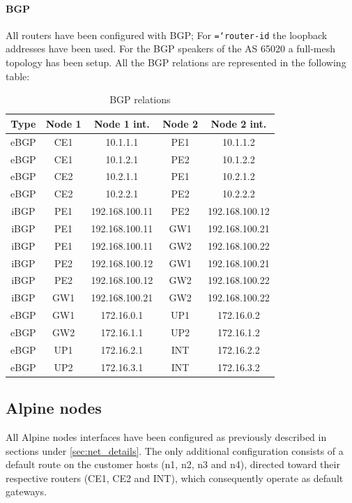 \documentclass{report}
\newcommand{\monospaced}[1]{\texttt{\hyphenchar\font=`\-#1}}
\begin{document}
\paragraph{BGP}
All routers have been configured with BGP; For \monospaced{router-id} the loopback addresses have been used. For the BGP speakers of the AS 65020 a full-mesh topology has been setup. All the BGP relations are represented in the following table: 
\begin{table}[H]
\begin{center}
\begin{tabular}{|c c c c c|} 
 \hline
 Type & Node 1 & Node 1 int. & Node 2 & Node 2 int. \\ [0.5ex] 
 \hline
 \hline
 eBGP & CE1 & 10.1.1.1 & PE1 & 10.1.1.2 \\
 eBGP & CE1 & 10.1.2.1 & PE2 & 10.1.2.2 \\
 eBGP & CE2 & 10.2.1.1 & PE1 & 10.2.1.2 \\
 eBGP & CE2 & 10.2.2.1 & PE2 & 10.2.2.2 \\\hline
 iBGP & PE1 & 192.168.100.11 & PE2 & 192.168.100.12 \\
 iBGP & PE1 & 192.168.100.11 & GW1 & 192.168.100.21 \\
 iBGP & PE1 & 192.168.100.11 & GW2 & 192.168.100.22 \\
 iBGP & PE2 & 192.168.100.12 & GW1 & 192.168.100.21 \\
 iBGP & PE2 & 192.168.100.12 & GW2 & 192.168.100.22 \\
 iBGP & GW1 & 192.168.100.21 & GW2 & 192.168.100.22 \\\hline
 eBGP & GW1 & 172.16.0.1 & UP1 & 172.16.0.2 \\
 eBGP & GW2 & 172.16.1.1 & UP2 & 172.16.1.2 \\
 eBGP & UP1 & 172.16.2.1 & INT & 172.16.2.2 \\
 eBGP & UP2 & 172.16.3.1 & INT & 172.16.3.2 \\\hline
\end{tabular}
\label{tab:bgp}
\caption{BGP relations}
\end{center}
\end{table}

\subsection{Alpine nodes}
All Alpine nodes interfaces have been configured as previously described in sections under \ref{sec:net_details}. The only additional configuration consists of a default route on the customer hosts (n1, n2, n3 and n4), directed toward their respective routers (CE1, CE2 and INT), which consequently operate as default gateways.
\end{document}
